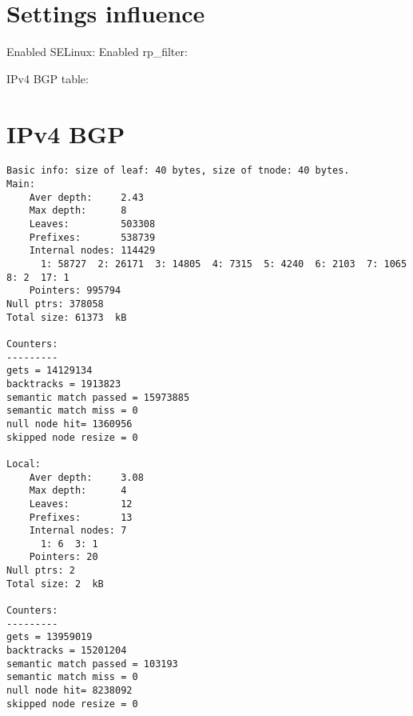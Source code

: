 \section{Settings influence}
Enabled SELinux:
Enabled rp\_filter:

IPv4 BGP table:



\section{IPv4 BGP}
\begin{lstlisting}
Basic info: size of leaf: 40 bytes, size of tnode: 40 bytes.
Main:
	Aver depth:     2.43
	Max depth:      8
	Leaves:         503308
	Prefixes:       538739
	Internal nodes: 114429
	  1: 58727  2: 26171  3: 14805  4: 7315  5: 4240  6: 2103  7: 1065  8: 2  17: 1
	Pointers: 995794
Null ptrs: 378058
Total size: 61373  kB

Counters:
---------
gets = 14129134
backtracks = 1913823
semantic match passed = 15973885
semantic match miss = 0
null node hit= 1360956
skipped node resize = 0

Local:
	Aver depth:     3.08
	Max depth:      4
	Leaves:         12
	Prefixes:       13
	Internal nodes: 7
	  1: 6  3: 1
	Pointers: 20
Null ptrs: 2
Total size: 2  kB

Counters:
---------
gets = 13959019
backtracks = 15201204
semantic match passed = 103193
semantic match miss = 0
null node hit= 8238092
skipped node resize = 0
\end{lstlisting}
